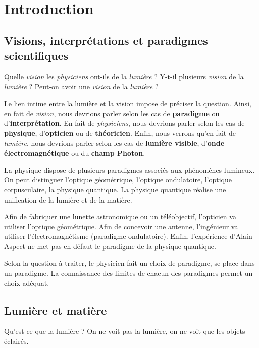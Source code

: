 \chapter{Introduction}

\section{Visions, interprétations et paradigmes scientifiques}

Quelle {\it vision} les {\it physiciens} ont-ils de la {\it lumière} ? Y-t-il plusieurs {\it vision} de la {\it lumière} ? Peut-on avoir une {\it vision} de la {\it lumière} ?

Le lien intime entre la lumière et la vision impose de préciser la question. Ainsi, en fait de {\it vision}, nous devrions parler selon les cas de {\bf paradigme} ou d'{\bf interprétation}. En fait de {\it physiciens}, nous devrions parler selon les cas de {\bf physique}, d'{\bf opticien} ou de {\bf théoricien}. Enfin, nous verrons qu'en fait de {\it lumière}, nous devrions parler selon les cas de {\bf lumière visible}, d'{\bf onde électromagnétique} ou du {\bf champ Photon}.


La physique dispose de plusieurs paradigmes associés aux phénomènes lumineux. On peut distinguer l'optique géométrique, l'optique ondulatoire, l'optique corpusculaire, la physique quantique.
La physique quantique réalise une unification de la lumière et de la matière.

Afin de fabriquer une lunette astronomique ou un téléobjectif, l'opticien va utiliser l'optique géométrique. Afin de concevoir une antenne, l'ingénieur va utiliser l'électromagnétisme (paradigme ondulatoire). Enfin, l'expérience d'Alain Aspect ne met pas en défaut le paradigme de la physique quantique.

Selon la question à traiter, le physicien fait un choix de paradigme, se place dans un paradigme. La connaissance des limites de chacun des paradigmes permet un choix adéquat.

\section{Lumière et matière}

Qu'est-ce que la lumière ? On ne voit pas la lumière, on ne voit que les objets éclairés.


